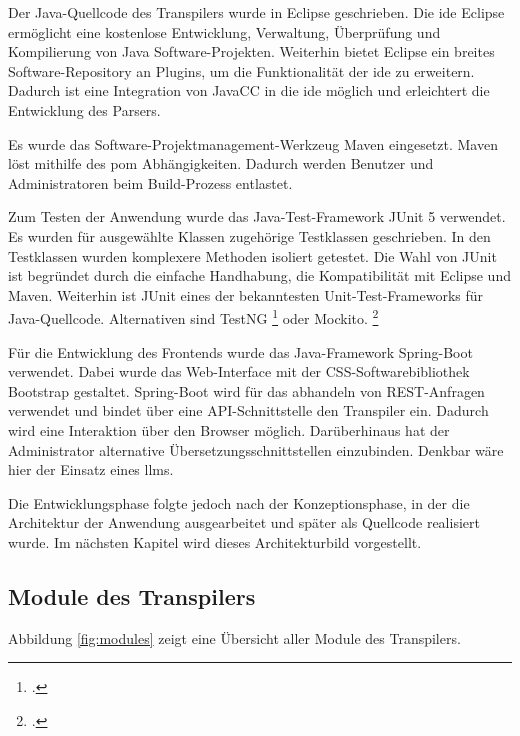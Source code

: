 Der Java-Quellcode des Transpilers wurde in Eclipse geschrieben. Die \ac{ide} Eclipse ermöglicht eine kostenlose Entwicklung, Verwaltung, Überprüfung und Kompilierung von Java Software-Projekten. Weiterhin bietet Eclipse ein breites Software-Repository an Plugins, um die Funktionalität der  \ac{ide} zu erweitern. Dadurch ist eine Integration von JavaCC in die  \ac{ide} möglich und erleichtert die Entwicklung des Parsers.

Es wurde das Software-Projektmanagement-Werkzeug Maven eingesetzt. Maven löst mithilfe des \ac{pom} Abhängigkeiten. Dadurch werden Benutzer und Administratoren beim Build-Prozess entlastet.

Zum Testen der Anwendung wurde das Java-Test-Framework JUnit 5 verwendet. Es wurden für ausgewählte Klassen zugehörige Testklassen geschrieben. In den Testklassen wurden komplexere Methoden isoliert getestet. Die Wahl von JUnit ist begründet durch die einfache Handhabung, die Kompatibilität mit Eclipse und Maven. Weiterhin ist JUnit eines der bekanntesten Unit-Test-Frameworks für Java-Quellcode. Alternativen sind  TestNG \footcite[Vgl. ][]{testng} oder Mockito. \footcite[Vgl. ][]{mockito}

Für die Entwicklung des Frontends wurde das Java-Framework Spring-Boot verwendet.
Dabei wurde das Web-Interface mit der CSS-Softwarebibliothek Bootstrap gestaltet.
Spring-Boot wird für das abhandeln von REST-Anfragen verwendet und bindet über eine API-Schnittstelle den Transpiler ein. Dadurch wird eine Interaktion über den Browser möglich. Darüberhinaus hat der Administrator alternative Übersetzungsschnittstellen einzubinden. Denkbar wäre hier der Einsatz eines \ac{llm}s.

Die Entwicklungsphase folgte jedoch nach der Konzeptionsphase, in der die Architektur der Anwendung ausgearbeitet und später als Quellcode realisiert wurde. 
Im nächsten Kapitel wird dieses Architekturbild vorgestellt.

\pagebreak
\subsection{Module des Transpilers} 

Abbildung \ref{fig:modules} zeigt eine Übersicht aller Module des Transpilers.

